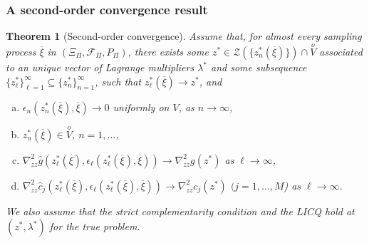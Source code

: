 \documentclass{beamer}
\newtheorem{theo}{Theorem}
\begin{document}
\begin{frame}
\frametitle{A second-order convergence result}

\begin{theo}[Second-order convergence]
\label{th:soc}
Assume that, for almost every sampling process $\overline{\xi}$ in $(\Xi_{\Pi}, \mathcal{F}_{\Pi}, P_{\Pi})$, there exists some $z^* \in \mathcal{Z} \left(\lbrace
  z^*_n(\overline{\xi})\rbrace\right) \cap \overset{o}{V}$ associated to an unique vector of Lagrange multipliers $\lambda^*$ and some subsequence $\lbrace z_{\ell}^* \rbrace_{\ell = 1}^{\infty} \subseteq \lbrace  z_n^* \rbrace_{n = 1}^{\infty}$, such that $z^*_{\ell}(\overline{\xi}) \rightarrow z^*$, and
\begin{enumerate}[(a)]
\item
$\epsilon_n \left( z^*_n(\overline{\xi}),\overline{\xi} \right)
  \rightarrow 0$ uniformly on $V$, as $n \rightarrow \infty$,
\item
$z^*_n(\overline{\xi}) \in \overset{o}{V}$, $n = 1,\ldots$,
\item
$\nabla^2_{zz} \hat{g} \left( z^*_{\ell}(\overline{\xi}), 
\epsilon_{\ell}(z^*_{\ell}(\overline{\xi}),\overline{\xi}) \right)
\rightarrow \nabla^2_{zz} g ( z^* )$ as $\ell \rightarrow \infty$,
\item
$\nabla^2_{zz} \hat{c}_j \left( z^*_{\ell}(\overline{\xi}), 
\epsilon_{\ell}(z^*_{\ell}(\overline{\xi}),\overline{\xi}) \right)
\rightarrow \nabla^2_{zz} c_j ( z^* )$ $(j=1,\ldots,M$) as
$\ell \rightarrow \infty$.
\end{enumerate}
We also assume that the strict complementarity condition and the LICQ hold at $( z^*, \lambda^* )$ for the true problem.
\end{theo}

\end{frame}
\end{document}
